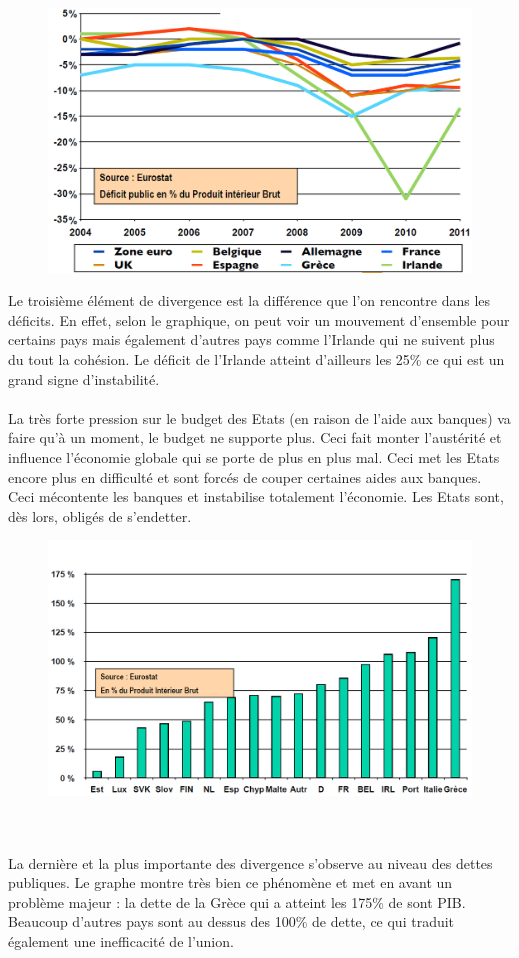 \begin{figure}
	\includegraphics[scale=0.3]{32}
\end{figure}
\noindent Le troisième élément de divergence est la différence que l'on rencontre dans les déficits. En effet, selon le graphique, on peut voir un mouvement d'ensemble pour certains pays mais également d'autres pays comme l'Irlande qui ne suivent plus du tout la cohésion. Le déficit de l'Irlande atteint d'ailleurs les 25\% ce qui est un grand signe d'instabilité. \\\\

La très forte pression sur le budget des Etats (en raison de l'aide aux banques) va faire qu'à un moment, le budget ne supporte plus. Ceci fait monter l'austérité et influence l'économie globale qui se porte de plus en plus mal. Ceci met les Etats encore plus en difficulté  et sont forcés de couper certaines aides aux banques. Ceci mécontente les banques et instabilise totalement l'économie. Les Etats sont, dès lors, obligés de s'endetter.

\begin{figure}
	\includegraphics[scale=0.3]{36}
\end{figure}
\ \\ \\ La dernière et la plus importante des divergence s'observe au niveau des dettes publiques. Le graphe montre très bien ce phénomène et met en avant un problème majeur : la dette de la Grèce qui a atteint les 175\% de sont PIB. Beaucoup d'autres pays sont au dessus des 100\% de dette, ce qui traduit également une inefficacité de l'union.

